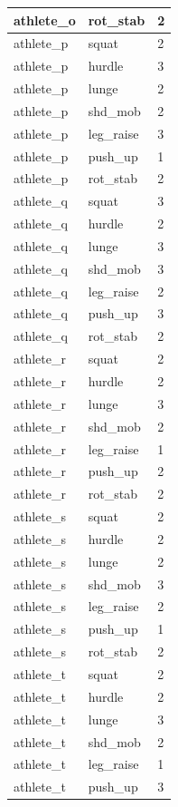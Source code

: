 \documentclass[
]{book}
\begin{document}
\begin{tabular}{l|l|l}
\hline
athlete\_o & rot\_stab & 2\\
\hline
athlete\_p & squat & 2\\
\hline
athlete\_p & hurdle & 3\\
\hline
athlete\_p & lunge & 2\\
\hline
athlete\_p & shd\_mob & 2\\
\hline
athlete\_p & leg\_raise & 3\\
\hline
athlete\_p & push\_up & 1\\
\hline
athlete\_p & rot\_stab & 2\\
\hline
athlete\_q & squat & 3\\
\hline
athlete\_q & hurdle & 2\\
\hline
athlete\_q & lunge & 3\\
\hline
athlete\_q & shd\_mob & 3\\
\hline
athlete\_q & leg\_raise & 2\\
\hline
athlete\_q & push\_up & 3\\
\hline
athlete\_q & rot\_stab & 2\\
\hline
athlete\_r & squat & 2\\
\hline
athlete\_r & hurdle & 2\\
\hline
athlete\_r & lunge & 3\\
\hline
athlete\_r & shd\_mob & 2\\
\hline
athlete\_r & leg\_raise & 1\\
\hline
athlete\_r & push\_up & 2\\
\hline
athlete\_r & rot\_stab & 2\\
\hline
athlete\_s & squat & 2\\
\hline
athlete\_s & hurdle & 2\\
\hline
athlete\_s & lunge & 2\\
\hline
athlete\_s & shd\_mob & 3\\
\hline
athlete\_s & leg\_raise & 2\\
\hline
athlete\_s & push\_up & 1\\
\hline
athlete\_s & rot\_stab & 2\\
\hline
athlete\_t & squat & 2\\
\hline
athlete\_t & hurdle & 2\\
\hline
athlete\_t & lunge & 3\\
\hline
athlete\_t & shd\_mob & 2\\
\hline
athlete\_t & leg\_raise & 1\\
\hline
athlete\_t & push\_up & 3\\

\end{tabular}
\end{document}
